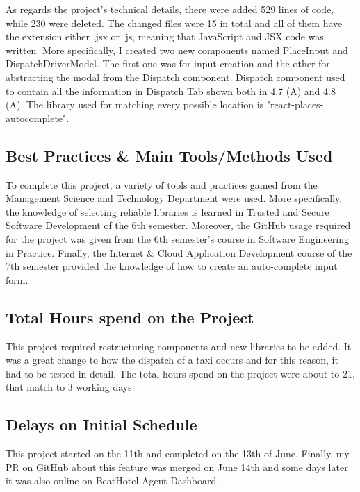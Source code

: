 As regards the project's technical details, there were added 529 lines of code, while 230 were deleted. The changed files were 15 in total and all of them have the extension either .jsx or .js, meaning that JavaScript and JSX code was written. More specifically, I created two new components named PlaceInput and DispatchDriverModel. The first one was for input creation and the other for abstracting the modal from the Dispatch component. Dispatch component used to contain all the information in Dispatch Tab shown both in 4.7 (A) and 4.8 (A). The library used for matching every possible location is "react-places-autocomplete".

\subsection{Best Practices \& Main Tools/Methods Used}

To complete this project, a variety of tools and practices gained from the Management Science and Technology Department were used. More specifically, the knowledge of selecting reliable libraries is learned in Trusted and Secure Software Development of the 6th semester. Moreover, the GitHub usage required for the project was given from the 6th semester's course in Software Engineering in Practice. Finally, the Internet \& Cloud Application Development course of the 7th semester provided the knowledge of how to create an auto-complete input form. \par

\subsection{Total Hours spend on the Project}

This project required restructuring components and new libraries to be added. It was a great change to how the dispatch of a taxi occurs and for this reason, it had to be tested in detail. The total hours spend on the project were about to 21, that match to 3 working days. \par

\subsection{Delays on Initial Schedule}

This project started on the 11th and completed on the 13th of June. Finally, my PR on GitHub about this feature was merged on June 14th and some days later it was also online on BeatHotel Agent Dashboard. \par

